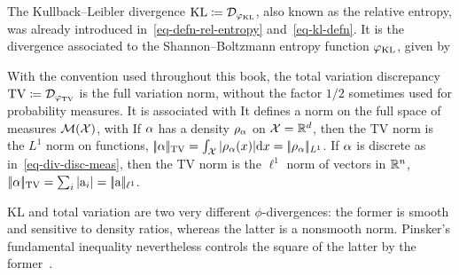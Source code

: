 \begin{example}
\label{ex_KLdiv}
The Kullback--Leibler divergence $\operatorname{KL} \coloneqq \mathcal{D}_{\varphi_{\operatorname{KL}}}$, also known as the relative entropy, was already introduced in~\eqref{eq-defn-rel-entropy} and~\eqref{eq-kl-defn}. It is the divergence associated to the Shannon--Boltzmann entropy function $\varphi_{\operatorname{KL}}$, given by
\end{example}

\begin{example}\label{exmp-tv}
With the convention used throughout this book, the total variation discrepancy $\operatorname{TV} \coloneqq \mathcal{D}_{\varphi_{\operatorname{TV}}}$ is the full variation norm, without the factor $1/2$ sometimes used for probability measures. It is associated with
It defines a norm on the full space of measures $\mathcal{M}(\mathcal{X})$, with
If $\alpha$ has a density $\rho_{\alpha}$ on $\mathcal{X}=\mathbb{R}^d$, then the TV norm is the $L^1$ norm on functions, $|\!| \alpha |\!|_{\operatorname{TV}} = \int_{\mathcal{X}} |\rho_{\alpha}(x)| \mathrm{d} x = |\!| \rho_{\alpha} |\!|_{L^1}$.
%
If $\alpha$ is discrete as in~\eqref{eq-div-disc-meas}, then the TV norm is the $\ell^1$ norm of vectors in $\mathbb{R}^n$, $|\!| \alpha |\!|_{\operatorname{TV}}=\sum_i |\mathrm{a}_i| = |\!| \mathrm{a} |\!|_{\ell^1}$.
\end{example}

KL and total variation are two very different $\phi$-divergences: the former is smooth and sensitive to density ratios, whereas the latter is a nonsmooth norm. Pinsker's fundamental inequality nevertheless controls the square of the latter by the former~\cite{pinsker1964information}.


